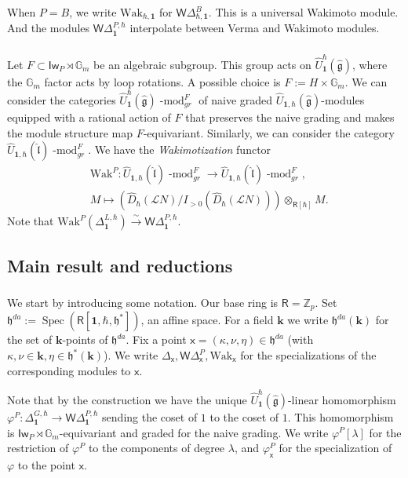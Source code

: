 \documentclass{amsart}
\theoremstyle{definition}
\newcommand{\sss}{\subsubsection{}}
\newcommand{\on}{\mathrm}
\newcommand{\Ring}{\mathsf{R}}
\newcommand{\hg}{\hat{\mathfrak{g}}}
\newcommand{\h}{\mathfrak{h}}
\newcommand{\Z}{\mathbb{Z}}
\newcommand{\Wak}{\on{Wak}}
\newcommand{\Loop}{\mathscr{L}}
\newcommand{\bone}{\mathbf{1}}
\newcommand{\hl}{\hat{\mathfrak{l}}}
\newcommand{\bk}{\mathbf{k}}
\newcommand{\Iw}{\mathsf{Iw}}
\newcommand{\WakDelta}{\mathsf{W}\Delta}
\newcommand{\sx}{\mathsf{x}}
\numberwithin{equation}{section}
\begin{document}
When $P=B$, we write $\Wak_{\hbar,\bone}$ for $\WakDelta^B_{\hbar,\bone}$. This is a universal Wakimoto module. And the modules 
$\WakDelta^{P,\hbar}_{\bone}$ interpolate between Verma and Wakimoto modules.

\sss Let $F\subset \Iw_P\rtimes \mathbb{G}_m$ be an algebraic subgroup.
This group acts on $\widehat{U}^\hbar_{\bone}(\hg)$, where the $\mathbb{G}_m$ factor acts by loop rotations. 
A possible choice is $F:=H\times \mathbb{G}_m$.
We can consider the categories $\widehat{U}_\bone^{\hbar}(\hg)\operatorname{-mod}^F_{gr}$ of naive graded $\widehat{U}_{\bone,\hbar}(\hg)$-modules equipped with a rational action of $F$ that preserves the naive grading and makes the module structure map $F$-equivariant. Similarly, we can consider the category 
$\widehat{U}_{\bone,\hbar}(\hl)\operatorname{-mod}^F_{gr}$. We have the {\it Wakimotization} functor 
\begin{align*}
&\Wak^P: \widehat{U}_{\bone,\hbar}(\hl)\operatorname{-mod}^F_{gr}\rightarrow 
\widehat{U}_{\bone,\hbar}(\hl)\operatorname{-mod}^F_{gr},\\ 
&M\mapsto 
(\widehat{D}_\hbar(\Loop N)/I_{>0}(\widehat{D}_\hbar(\Loop N)))\otimes_{\Ring[\hbar]}M.
\end{align*}
Note that $\Wak^P(\Delta^{L,\hbar}_{\bone})\xrightarrow{\sim}\WakDelta^{P,\hbar}_\bone$.

\subsection{Main result and reductions}
\sss We start by introducing some notation.
Our base ring is $\Ring=\Z_p$.
Set $\h^{da}:=\operatorname{Spec}(\Ring[\bone,\hbar,\h^*])$, an affine space. For a field $\bk$ we write $\h^{da}(\bk)$ for the set of $\bk$-points of $\h^{da}$. Fix a point $\sx=(\kappa,\nu,\eta)\in \h^{da}$
(with $\kappa,\nu\in \bk, \eta\in \h^*(\bk)$). We write $\Delta_{\sx},
\WakDelta^P_{\sx}, \Wak_{\sx}$ for the specializations of the corresponding modules to $\sx$. 

Note that by the construction we have the unique  $\widehat{U}_\bone^{\hbar}(\hg)$-linear homomorphism $\varphi^P:\Delta^{G,\hbar}_{\bone}\rightarrow \WakDelta^{P,\hbar}_{\bone}$ sending the coset of $1$ to the coset of $1$. This homomorphism is $\Iw_P\rtimes \mathbb{G}_m$-equivariant and graded for the naive grading. We write $\varphi^P[\lambda]$ for the restriction of $\varphi^P$ to the components of degree $\lambda$, and $\varphi^P_{\sx}$ for the specialization of $\varphi$ to the point $\sx$. 
\end{document}
